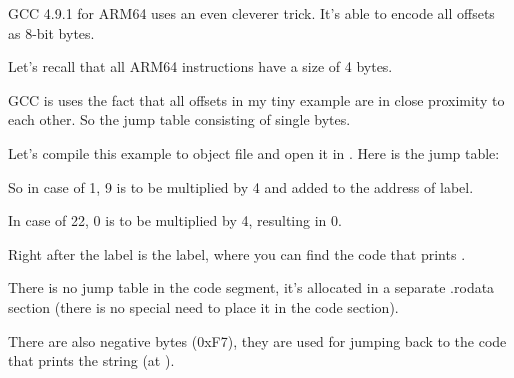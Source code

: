 GCC 4.9.1 for ARM64 uses an even cleverer trick.
It's able to encode all offsets as 8-bit bytes.

Let's recall that all ARM64 instructions have a size of 4 bytes.

GCC is uses the fact that all offsets in my tiny example are in close proximity to each other.
So the jump table consisting of single bytes.



Let's compile this example to object file and open it in \IDA. Here is the jump table:



So in case of 1, 9 is to be multiplied by 4 and added to the address of  label.

In case of 22, 0 is to be multiplied by 4, resulting in 0. 

Right after the  label is the  label, where you can find the code that prints .

There is no jump table in the code segment, it's allocated in a separate .rodata section 
(there is no special need to place it in the code section).

There are also negative bytes (0xF7), they are used for jumping back to the code that prints the  string (at ).

